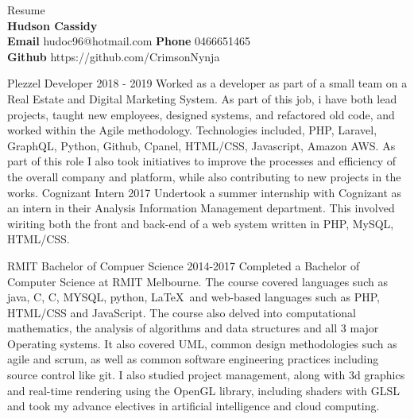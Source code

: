 \documentclass[9pt]{developercv}
\newcommand{\CC}{C\nolinebreak\hspace{-.05em}\raisebox{.4ex}{\tiny\bf +}\nolinebreak\hspace{-.10em}\raisebox{.4ex}{\tiny\bf +}}
\def\CC{{C\nolinebreak[4]\hspace{-.05em}\raisebox{.4ex}{\tiny\bf ++}}}
\begin{document}
	\begin{minipage}[a]{1.0\textwidth}
		\begin{center}
			{\HUGE Resume}\\
			\textbf {Hudson Cassidy} \\
			\textbf {Email} hudoc96@hotmail.com
			\textbf {Phone} 0466651465 \\
			\textbf {Github} https://github.com/CrimsonNynja \\
		\end{center}
	\end{minipage}
	\begin{minipage}[t]{0.6\textwidth}
		\begin{entrylist}
			\entry
				{Plezzel}
				{Developer}
				{2018 - 2019}
				{Worked as a developer as part of a small team on a Real Estate and Digital Marketing System. As part of this job, i have both lead projects, taught new employees, designed systems, and refactored old code, and worked within the Agile methodology. Technologies included, PHP, Laravel, GraphQL, Python, Github, Cpanel, HTML/CSS, Javascript, Amazon AWS. As part of this role I also took initiatives to improve the processes and efficiency of the overall company and platform, while also contributing to new projects in the works.}
			\entry
				{Cognizant}
				{Intern}
				{2017}
				{Undertook a summer internship with Cognizant as an intern in their Analysis Information Management department. This involved wiriting both the front and back-end of a web system written in PHP, MySQL, HTML/CSS.}
		\end{entrylist}	
		\cvsect{Education}
		\begin{entrylist}
			\entry
				{RMIT}
				{Bachelor of Compuer Science}
				{2014-2017}
				{Completed a Bachelor of Computer Science at RMIT Melbourne. The course covered languages such as java, C, \CC, MYSQL, python, \LaTeX  \  and web-based languages such as PHP, HTML/CSS and JavaScript. The course also delved into computational mathematics, the analysis of algorithms and data structures and all 3 major Operating systems. It also covered UML, common design methodologies such as agile and scrum, as well as common software engineering practices including source control like git. I also studied project management, along with 3d graphics and real-time rendering using the OpenGL library, including shaders with GLSL and took my advance electives in artificial intelligence and cloud computing.}
		\end{entrylist}

\end{minipage}
\end{document}
